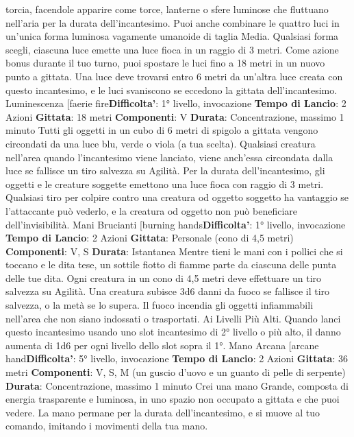\begin{multicols}{2}
torcia, facendole apparire come torce, lanterne o sfere
luminose che fluttuano nell’aria per la durata
dell’incantesimo. Puoi anche combinare le quattro luci
in un’unica forma luminosa vagamente umanoide di
taglia Media. Qualsiasi forma scegli, ciascuna luce
emette una luce fioca in un raggio di 3 metri.
Come azione bonus durante il tuo turno, puoi spostare
le luci fino a 18 metri in un nuovo punto a gittata. Una
luce deve trovarsi entro 6 metri da un’altra luce creata
con questo incantesimo, e le luci svaniscono se
eccedono la gittata dell’incantesimo.
Luminescenza
[faerie fire\textbf{Difficolta'}:
1° livello, invocazione
\textbf{Tempo di Lancio}: 2 Azioni
\textbf{Gittata}: 18 metri
\textbf{Componenti}: V
\textbf{Durata}: Concentrazione, massimo 1 minuto
Tutti gli oggetti in un cubo di 6 metri di spigolo a gittata
vengono circondati da una luce blu, verde o viola (a tua
scelta). Qualsiasi creatura nell’area quando
l’incantesimo viene lanciato, viene anch’essa circondata
dalla luce se fallisce un tiro salvezza su Agilità. Per
la durata dell’incantesimo, gli oggetti e le creature
soggette emettono una luce fioca con raggio di 3 metri.
Qualsiasi tiro per colpire contro una creatura od oggetto
soggetto ha vantaggio se l’attaccante può vederlo, e la
creatura od oggetto non può beneficiare dell’invisibilità.
Mani Brucianti
[burning hands\textbf{Difficolta'}:
1° livello, invocazione
\textbf{Tempo di Lancio}: 2 Azioni
\textbf{Gittata}: Personale (cono di 4,5 metri)
\textbf{Componenti}: V, S
\textbf{Durata}: Istantanea
Mentre tieni le mani con i pollici che si toccano e le dita
tese, un sottile fiotto di fiamme parte da ciascuna delle
punta delle tue dita. Ogni creatura in un cono di 4,5
metri deve effettuare un tiro salvezza su Agilità.
Una creatura subisce 3d6 danni da fuoco se fallisce il
tiro salvezza, o la metà se lo supera.
Il fuoco incendia gli oggetti infiammabili nell’area che
non siano indossati o trasportati.
Ai Livelli Più Alti. Quando lanci questo incantesimo
usando uno slot incantesimo di 2° livello o più alto, il
danno aumenta di 1d6 per ogni livello dello slot sopra il
1°.
Mano Arcana
[arcane hand\textbf{Difficolta'}:
5° livello, invocazione
\textbf{Tempo di Lancio}: 2 Azioni
\textbf{Gittata}: 36 metri
\textbf{Componenti}: V, S, M (un guscio d’uovo e un guanto di
pelle di serpente)
\textbf{Durata}: Concentrazione, massimo 1 minuto
Crei una mano Grande, composta di energia
trasparente e luminosa, in uno spazio non occupato a
gittata e che puoi vedere. La mano permane per la
durata dell’incantesimo, e si muove al tuo comando,
imitando i movimenti della tua mano.

\end{multicols}
